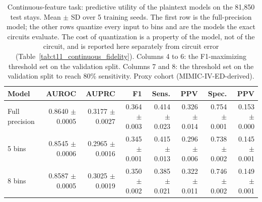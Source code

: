 \begin{table}[t]
\centering
\caption{Continuous-feature task: predictive utility of the plaintext models on the 81,850 test stays. Mean $\pm$ SD over 5 training seeds. The first row is the full-precision model; the other rows quantize every input to bins and are the models the exact circuits evaluate. The cost of quantization is a property of the model, not of the circuit, and is reported here separately from circuit error (Table~\ref{tab:t11_continuous_fidelity}). Columns 4 to 6: the F1-maximizing threshold set on the validation split. Columns 7 and 8: the threshold set on the validation split to reach 80\% sensitivity. Proxy cohort (MIMIC-IV-ED-derived).}
\label{tab:t12_continuous_utility}
\begin{tabular}{lrrrrrrr}
\toprule
Model & AUROC & AUPRC & F1 & Sens. & PPV & Spec. & PPV \\
\midrule
Full precision & 0.8640 $\pm$ 0.0005 & 0.3177 $\pm$ 0.0027 & 0.364 $\pm$ 0.003 & 0.414 $\pm$ 0.023 & 0.326 $\pm$ 0.014 & 0.754 $\pm$ 0.001 & 0.153 $\pm$ 0.000 \\
5 bins & 0.8545 $\pm$ 0.0006 & 0.2965 $\pm$ 0.0016 & 0.345 $\pm$ 0.001 & 0.415 $\pm$ 0.013 & 0.296 $\pm$ 0.006 & 0.738 $\pm$ 0.002 & 0.145 $\pm$ 0.001 \\
8 bins & 0.8587 $\pm$ 0.0005 & 0.3025 $\pm$ 0.0019 & 0.350 $\pm$ 0.002 & 0.385 $\pm$ 0.021 & 0.322 $\pm$ 0.011 & 0.746 $\pm$ 0.002 & 0.149 $\pm$ 0.001 \\
\bottomrule
\end{tabular}
\end{table}
